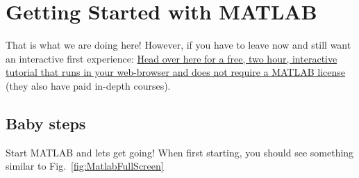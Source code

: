 \section{Getting Started with MATLAB}
That is what we are doing here!
However, if you have to leave now and still want an interactive first experience: \href{https://matlabacademy.mathworks.com/}{Head over here for a free, two hour, interactive tutorial that runs in your web-browser and does not require a MATLAB license} (they also have paid in-depth courses).

\subsection{Baby steps}
Start MATLAB and lets get going!
When first starting, you should see something similar to Fig.~\ref{fig:MatlabFullScreen}